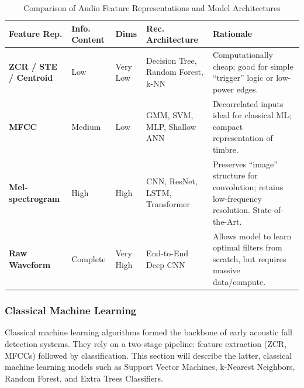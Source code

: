 \documentclass[11pt, a4paper, twoside]{article}
\begin{document}
\begin{table}[h!]
\centering
\small %
\renewcommand{\arraystretch}{1.5} %
\caption{Comparison of Audio Feature Representations and Model Architectures}
\label{tab:audio_features}
\begin{tabularx}{\textwidth}{|p{2.2cm}|p{2.5cm}|p{2.2cm}|X|X|}
\hline
\textbf{Feature Rep.} & \textbf{Info. Content} & \textbf{Dims} & \textbf{Rec. Architecture} & \textbf{Rationale} \\ 
\hline
\textbf{ZCR / STE / Centroid} 
& Low \newline 
& Very Low \newline 
& Decision Tree, Random Forest, k-NN 
& Computationally cheap; good for simple ``trigger'' logic or low-power edges. \\ 
\hline
\textbf{MFCC} 
& Medium \newline 
& Low \newline 
& GMM, SVM, MLP, Shallow ANN 
& Decorrelated inputs ideal for classical ML; compact representation of timbre. \\ 
\hline
\textbf{Mel-spectrogram} 
& High \newline 
& High \newline 
& CNN, ResNet, LSTM, Transformer 
& Preserves ``image'' structure for convolution; retains low-frequency resolution. State-of-the-Art. \\ 
\hline
\textbf{Raw Waveform} 
& Complete \newline 
& Very High \newline
& End-to-End Deep CNN 
& Allows model to learn optimal filters from scratch, but requires massive data/compute. \\ 
\hline
\end{tabularx}
\end{table}



\subsubsection{Classical Machine Learning}
Classical machine learning algorithms formed the backbone of early acoustic fall detection systems. They rely on a two-stage pipeline: feature extraction (ZCR, MFCCs) followed by classification. This section will describe the latter, classical machine learning models such as Support Vector Machines, k-Nearest Neighbors, Random Forest, and Extra Trees Classifiers.
\newline
\newline
\end{document}
